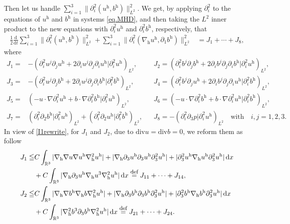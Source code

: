 \documentclass[11pt]{amsart}
\theoremstyle{definition}
\newcommand{\R}{\mathbb{R}}
\newcommand{\h}{\mathrm{h}}
\def\eqdefa{\buildrel\hbox{\footnotesize def}\over =}
\newcommand{\dx}{\,{\rm d}x}
\newcommand{\nablah}{\nabla_{\mathrm{h}}}
\numberwithin{equation}{section}
\begin{document}
Then let us handle  $\sum_{i=1}^{3}\|\partial_{i}^2(u^\h,b^\h)\|_{L^2}^{2}$. We get, by applying $\partial_{i}^2$ to the equations of  $u^\mathrm{h}$ and $b^\mathrm{h}$ in systems \eqref{eq.MHD}, and then taking the $L^2$ inner product to the new equations with $\partial_{i}^2u^\mathrm{h}$ and $\partial_{i}^2b^\mathrm{h}$, respectively, that
\begin{align}\label{en_H2_h}
	\frac12\frac{\mathrm{d}}{\mathrm{d}t}\sum_{i=1}^{3}\|\partial_{i}^2(u^\h,b^\h)\|_{L^2}^2+\sum_{i=1}^{3}\|\partial_{i}^2(\nabla_{\mathrm{h}}u^\h,\partial_{1}b^\h)\|_{L^2}^2&=J_{1}+\cdots+J_{8},
\end{align}
where
\begin{align*}
	J_{1}
	=&-\left(\partial_{i}^2u^j\partial_ju^\h+2\partial_{i}u^j\partial_j \partial_{i}u^\h|\partial_{i}^2u^\h\right)_{L^2},&&J_{2}=\left(\partial_{i}^2b^j\partial_jb^\h+2\partial_{i}b^j\partial_j \partial_{i}b^\h|\partial_{i}^2u^\h\right)_{L^2},\\
	J_{3}
	=&-\left(\partial_{i}^2u^j\partial_jb^\h+2\partial_{i}u^j\partial_j \partial_{i}b^\h|\partial_{i}^2b^\h\right)_{L^2},&&J_{4}=\left(\partial_{i}^2b^j\partial_ju^\h+2\partial_{i}b^j\partial_j \partial_{i}u^\h|\partial_{i}^2b^\h\right)_{L^2},\\
	J_{5}
	=&\left(-u\cdot\nabla \partial_{i}^2u^\h+b\cdot\nabla \partial_{i}^2b^\h|\partial_{i}^2u^\h\right)_{L^2},&&J_{6}=\left(-u\cdot\nabla \partial_{i}^2b^\h+b\cdot\nabla \partial_{i}^2u^\h|\partial_{i}^2b^\h\right)_{L^2},\\
	J_{7}=&\left( \partial_{i}^2\partial_{2}b^\h|\partial_{i}^2u^\h \right)_{L^2}+\left( \partial_{i}^2\partial_{2}u^\h|\partial_{i}^2b^\h \right)_{L^2} ,&&J_{8}=-\left(\partial_{i}^2\partial_{3}p|\partial_{i}^2u^\h\right)_{L^2}\quad \mathrm{with}\quad i,j=1,2,3.
\end{align*}
In view of \eqref{I1rewrite}, for $J_1$ and $J_2$, due to $\mathrm{div}u=\mathrm{div}b=0$, we reform them as follow
\begin{align*}
	J_{1}\leqq& C\int_{\R^3}|\nablah\nabla u\nabla u^\h \nablah^2 u^\h|+|\nablah\partial_3u^\h\partial_3 u^\h \partial_3^2 u^\h|+|\partial_3^2u^\h\nablah u^\h \partial_3^2 u^\h|\dx\nonumber\\
	&+C\int_{\R^3}|\nablah\partial_3 u^\h\nablah u^3 \nablah^2 u ^\h|\dx\eqdefa J_{11}+\cdots+J_{14},\\
	J_{2}\leqq& C\int_{\R^3}|\nablah\nabla b^\h\nablah b\nablah^2 u^\h|+|\nablah\partial_3b^\h\partial_3 b^\h \partial_3^2 u^\h|+|\partial_3^2b^\h\nablah b^\h \partial_3^2 u^\h|\dx\nonumber\\
	&+C\int_{\R^3}|\nablah^2 b^3\partial_3 b^\h \nablah^2 u ^\h|\dx\eqdefa J_{21}+\cdots+J_{24}.
\end{align*}
\end{document}
